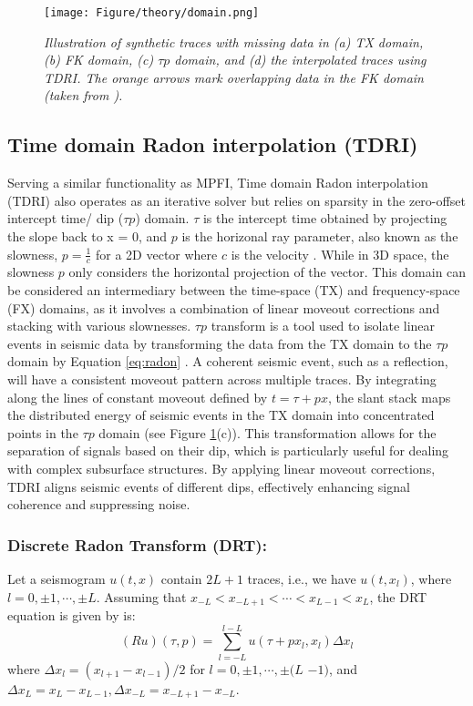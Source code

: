 \begin{figure}[h]
	\centering
	\texttt{[image: Figure/theory/domain.png]} 
	\caption{\textit{Illustration of synthetic traces with missing data in (a) TX domain, (b) FK domain, (c) $\tau p$ domain, and (d) the interpolated traces using TDRI. The orange arrows mark overlapping data in the FK domain (taken from ).}}
	\label{fig:domain}
\end{figure}

\subsection{Time domain Radon interpolation (TDRI)}
Serving a similar functionality as MPFI, Time domain Radon interpolation (TDRI) also operates as an iterative solver but relies on sparsity in the zero-offset intercept time/ dip ($\tau p$) domain. $\tau$ is the intercept time obtained by projecting the slope back to x = 0, and $p$ is the horizonal ray parameter, also known as the slowness, $p=\frac{1}{c}$ for a 2D vector where $c$ is the velocity \cite{diebold1981traveltime}. While in 3D space, the slowness $p$ only considers the horizontal projection of the vector. This domain can be considered an intermediary between the time-space (TX) and frequency-space (FX) domains, as it involves a combination of linear moveout corrections and stacking with various slownesses. $\tau p$ transform is a tool used to isolate linear events in seismic data by transforming the data from the TX domain to the $\tau p$ domain by Equation \ref{eq:radon} \cite{beylkin1987discrete}. A coherent seismic event, such as a reflection, will have a consistent moveout pattern across multiple traces. By integrating along the lines of constant moveout defined by 
$t=\tau+px$, the slant stack maps the distributed energy of seismic events in the TX domain into concentrated points in the $\tau p$ domain (see Figure \ref{fig:domain}(c)). This transformation allows for the separation of signals based on their dip, which is particularly useful for dealing with complex subsurface structures. By applying linear moveout corrections, TDRI aligns seismic events of different dips, effectively enhancing signal coherence and suppressing noise.
\subsubsection{Discrete Radon Transform (DRT):}
\noindent Let a seismogram $u(t, x)$ contain $2 L+1$ traces, i.e., we have $u\left(t, x_l\right)$, where $l=0, \pm 1, \cdots, \pm L$. Assuming that $x_{-L}<x_{-L+1}<\cdots<x_{L-1}<x_L$, the DRT equation is given by  is:
\begin{equation}
	(R u)(\tau, p)=\sum_{l=-L}^{l-L} u\left(\tau+p x_l, x_l\right) \Delta x_l
	\label{eq:radon}
\end{equation}
\noindent where $\Delta x_l=\left(x_{l+1}-x_{l-1}\right) / 2$ for $l=0, \pm 1, \cdots, \pm(L$ $-1)$, and $\Delta x_L=x_L-x_{L-1}, \Delta x_{-L}=x_{-L+1}-x_{-L}$. 
\\
